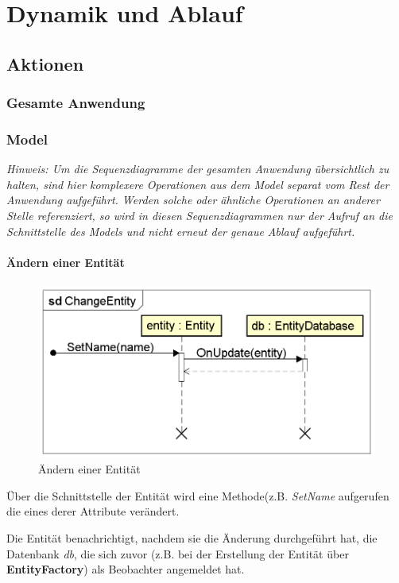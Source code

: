 \documentclass[a4paper]{scrreprt}
\begin{document}
\chapter{Dynamik und Ablauf}
\section{Aktionen}
\subsection{Gesamte Anwendung}

\subsection{Model}
\textit{Hinweis: Um die Sequenzdiagramme der gesamten Anwendung übersichtlich zu halten, sind hier komplexere Operationen aus dem Model separat vom Rest der Anwendung aufgeführt. Werden solche oder ähnliche Operationen an anderer Stelle referenziert, so wird in diesen Sequenzdiagrammen nur der Aufruf an die Schnittstelle des Models und nicht erneut der genaue Ablauf aufgeführt.}
 
\subsubsection{Ändern einer Entität}
\begin{figure}[H]
\centering
\includegraphics[width=0.75\textheight]{graphics/Klassendiagramme/Model/ChangeEntity.png}
\caption{Ändern einer Entität}
\end{figure}
Über die Schnittstelle der Entität wird eine Methode(z.B. \textit{SetName} aufgerufen die eines derer Attribute verändert.

Die Entität benachrichtigt, nachdem sie die Änderung durchgeführt hat, die Datenbank \textit{db}, die sich zuvor (z.B. bei der Erstellung der Entität über \textbf{EntityFactory}) als Beobachter angemeldet hat.
\end{document}
